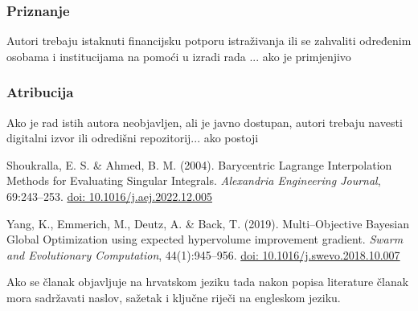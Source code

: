 \documentclass{crebsshr}
\begin{document}
    \subsubsection*{Priznanje} Autori trebaju istaknuti financijsku potporu istraživanja ili se zahvaliti određenim osobama i institucijama na pomoći u izradi rada ...{\color{red} ako je primjenjivo}

    \vspace{-0.1cm}
    \subsubsection*{Atribucija} Ako je rad istih autora neobjavljen, ali je javno dostupan, autori trebaju navesti digitalni izvor ili odredišni repozitorij...{\color{red} ako postoji}
    \medskip
    
    \newpage
    
    
    \begin{thebibliography}{99}
        
        Shoukralla, E. S. \& Ahmed, B. M. (2004). Barycentric Lagrange Interpolation Methods for Evaluating Singular Integrals. \emph{Alexandria Engineering Journal}, 69:243--253. \href{https://doi.org/10.1016/j.aej.2022.12.005}{doi: 10.1016/j.aej.2022.12.005}
        
        Yang, K., Emmerich, M., Deutz, A. \& Back, T. (2019). Multi--Objective Bayesian Global Optimization using expected hypervolume improvement gradient. \emph{Swarm and Evolutionary Computation}, 44(1):945--956. \href{https://doi.org/10.1016/j.swevo.2018.10.007}{doi: 10.1016/j.swevo.2018.10.007}
        
        
    \end{thebibliography}
    
    \bigskip
    \bigskip
    
\noindent Ako se članak objavljuje na hrvatskom jeziku tada nakon popisa literature članak mora sadržavati naslov, sažetak i ključne riječi na engleskom jeziku.
\end{document}
